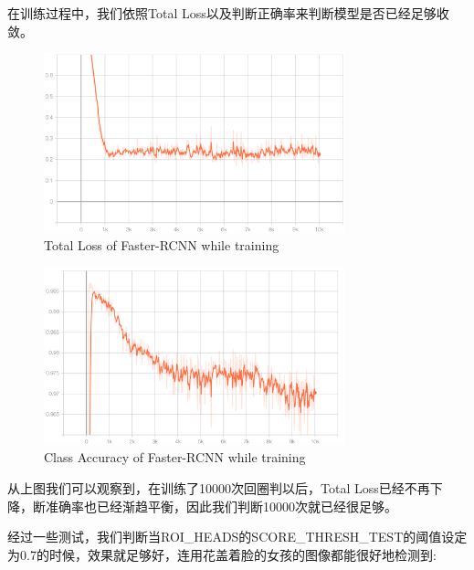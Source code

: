 \documentclass[journal,transmag]{IEEEtran}
\begin{document}
在训练过程中，我们依照Total Loss以及判断正确率来判断模型是否已经足够收敛。
\begin{figure}[h]
\centering
\includegraphics[width=3.44in]{bloss.png}
\caption{Total Loss of Faster-RCNN while training}
\end{figure}

\begin{figure}[h]
\centering
\includegraphics[width=3.44in]{bacc.png}
\caption{Class Accuracy of Faster-RCNN while training}
\end{figure}

从上图我们可以观察到，在训练了10000次回圈判以后，Total Loss已经不再下降，断准确率也已经渐趋平衡，因此我们判断10000次就已经很足够。

经过一些测试，我们判断当ROI\_HEADS的SCORE\_THRESH\_TEST的阈值设定为0.7的时候，效果就足够好，连用花盖着脸的女孩的图像都能很好地检测到:
\end{document}

